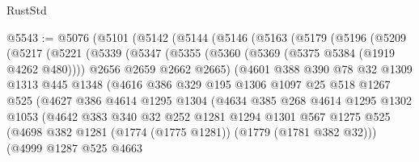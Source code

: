 \begin{lexlean}{RustStd}
\begin{coremodule}
@5543 := @5076
    (@5101
      (@5142
        (@5144
          (@5146
            (@5163
              (@5179
                (@5196
                  (@5209
                    (@5217
                      (@5221
                        (@5339
                          (@5347
                            (@5355
                              (@5360 (@5369 (@5375 @5384 (@1919 @4262 @480))))
                              @2656
                              @2659
                              @2662
                              @2665)
                            (@4601
                              @388
                              @390
                              @78
                              @32
                              @1309
                              @1313
                              @445
                              @1348
                              (@4616
                                @386
                                @329
                                @195
                                @1306
                                @1097
                                @25
                                @518
                                @1267
                                @525
                                (@4627
                                  @386
                                  @4614
                                  @1295
                                  @1304
                                  (@4634
                                    @385
                                    @268
                                    @4614
                                    @1295
                                    @1302
                                    @1053
                                    (@4642
                                      @383
                                      @340
                                      @32
                                      @252
                                      @1281
                                      @1294
                                      @1301
                                      @567
                                      @1275
                                      @525
                                      (@4698
                                        @382
                                        @1281
                                        (@1774 (@1775 @1281))
                                        (@1779 (@1781 @382 @32)))
                                      (@4999
                                        @1287
                                        @525
                                        @4663

\end{coremodule}
\end{lexlean}
